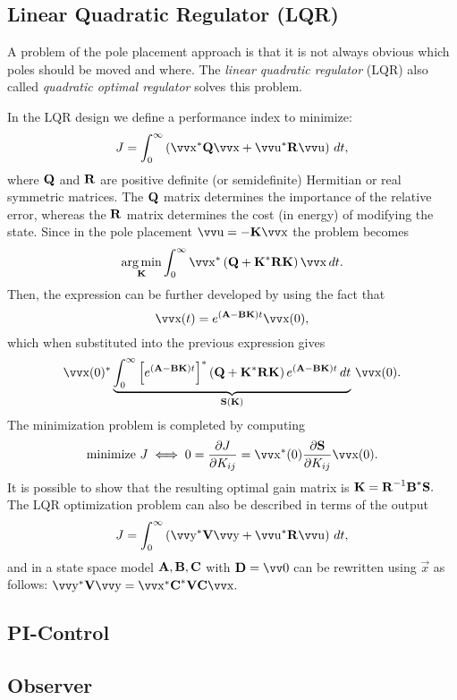 \subsection{Linear Quadratic Regulator (LQR)}

A problem of the pole placement approach is that it is not always obvious which poles should be moved and where. The \emph{linear quadratic regulator} (LQR) also called \emph{quadratic optimal regulator} solves this problem.

In the LQR design we define a performance index to minimize:
\[
	J = \int_0^\infty \left(
		\vec{x}^* \mx{Q} \vec{x} + \vec{u}^* \mx{R} \vec{u}
	\right) \, dt,
\]
where \(\bm{\mathrm{Q}}\) and \(\bm{\mathrm{R}}\) are positive definite (or semidefinite) Hermitian or real symmetric matrices. The \(\bm{\mathrm{Q}}\) matrix determines the importance of the relative error, whereas the \(\bm{\mathrm{R}}\) matrix determines the cost (in energy) of modifying the state.  Since in the pole placement \(\vec{u} = -\mx{K}\vec{x}\) the problem becomes
\[
	\argmin_{\mx{K}}
	\int_0^\infty \vec{x}^* \left(
		\mx{Q} + \mx{K}^* \mx{R} \mx{K}
	\right) \vec{x} \, dt.
\]
Then, the expression can be further developed by using the fact that
\[
	\vec{x}(t) = e^{(\mx{A} - \mx{B}\mx{K}) t} \vec{x}(0),
\]
which when substituted into the previous expression gives
\[
	\vec{x}(0)^* \underbrace{\int_0^\infty \left[
			e^{(\mx{A} - \mx{B}\mx{K}) t}
		\right]^* \left(
			\mx{Q} + \mx{K}^* \mx{R} \mx{K}
		\right) e^{(\mx{A} - \mx{B}\mx{K}) t}
		\, dt}_{\mx{S}(\mx{K})}
	\, \vec{x}(0).
\]
The minimization problem is completed by computing
\[
	\text{minimize } J \iff
	0 = \frac{\partial J}{\partial K_{ij}} =
	\vec{x}^*(0) \frac{\partial \mx{S}}{\partial K_{ij}} \vec{x}(0).
\]
It is possible to show that the resulting optimal gain matrix is
\(
	\bm{\mathrm{K}} = \bm{\mathrm{R}}^{-1} \bm{\mathrm{B}}^* \bm{\mathrm{S}}.
\)
The LQR optimization problem can also be described in terms of the output
\[
	J = \int_0^\infty \left(
		\vec{y}^* \mx{V} \vec{y} + \vec{u}^* \mx{R} \vec{u}
	\right) \, dt,
\]
and in a state space model \(\bm{\mathrm{A}}, \bm{\mathrm{B}}, \bm{\mathrm{C}}\) with \(\mx{D} = \vec{0}\) can be rewritten using \(\vec{x}\) as follows:
\(
	\vec{y}^* \mx{V} \vec{y} =
	\vec{x}^* \mx{C}^* \mx{V} \mx{C} \vec{x}.
\)

\subsection{PI-Control}


\subsection{Observer}

